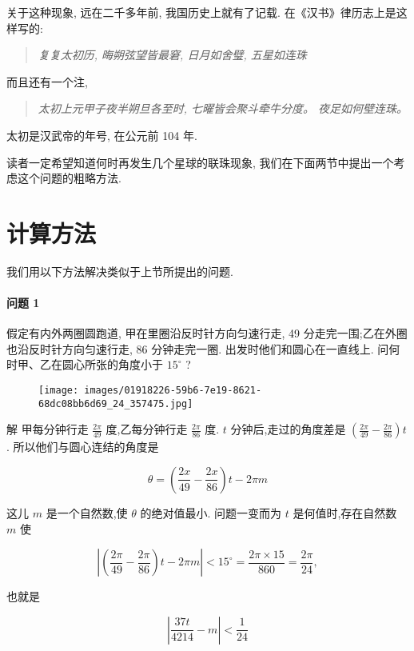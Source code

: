 \documentclass{ctexart}
\begin{document}
关于这种现象, 远在二千多年前, 我国历史上就有了记载. 在《汉书》律历志上是这样写的:
\begin{quotation}
  \textit{复复太初历, 晦朔弦望皆最窘, 日月如舍璧, 五星如连珠}
  \end{quotation}
  而且还有一个注,
\begin{quotation}
\textit{太初上元甲子夜半朔旦各至时, 七曜皆会聚斗牵牛分度。 夜足如何壁连珠。}
\end{quotation}

太初是汉武帝的年号, 在公元前 104 年.

读者一定希望知道何时再发生几个星球的联珠现象, 我们在下面两节中提出一个考虑这个问题的粗略方法.

\section{计算方法}

我们用以下方法解决类似于上节所提出的问题.

\paragraph*{问题 1} 假定有内外两圈圆跑道, 甲在里圈沿反时针方向匀速行走, 49 分走完一围;乙在外圈也沿反时针方向匀速行走, 86 分钟走完一圈. 出发时他们和圆心在一直线上. 问何时甲、乙在圆心所张的角度小于 \({15}^{ \circ }\) ?

\begin{figure}[h]
\begin{center}
  \texttt{[image: images/01918226-59b6-7e19-8621-68dc08bb6d69\_24\_357475.jpg]}
  \caption{\label{fig:3}}
\end{center}
\end{figure}


解 甲每分钟行走 \(\frac{2\pi}{49}\) 度,乙每分钟行走 \(\frac{2\pi }{86}\) 度. \(t\) 分钟后,走过的角度差是 \(\left( {\frac{2\pi}{49} - \frac{2\pi }{86}}\right) t\) . 所以他们与圆心连结的角度是

\[
\theta = \left( {\frac{2x}{49} - \frac{2x}{86}}\right) t - {2\pi m}
\]

这儿 \(m\) 是一个自然数,使 \(\theta\) 的绝对值最小. 问题一变而为 \(t\) 是何值时,存在自然数 \(m\) 使

\[
\left| {\left( {\frac{2\pi }{49} - \frac{2\pi }{86}}\right) t - {2\pi m}}\right| < {15}^{ \circ } = \frac{{2\pi } \times {15}}{860} = \frac{2\pi }{24},
\]

也就是

\[
\left| {\frac{37t}{4214} - m}\right| < \frac{1}{24}
\]
\end{document}
